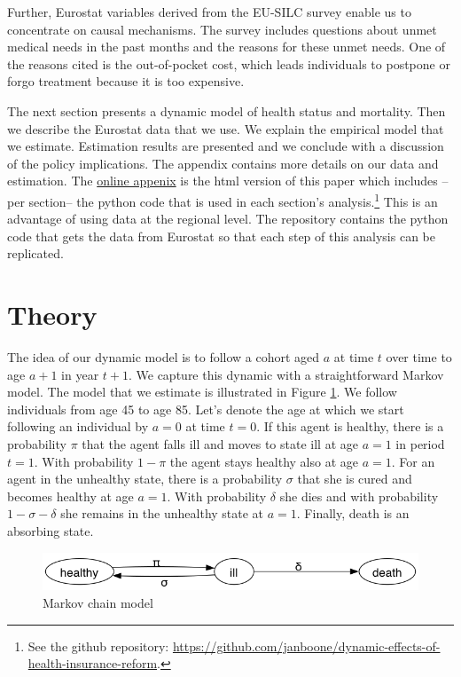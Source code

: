\documentclass[a4paper,12pt]{article}
\begin{document}
Further, Eurostat variables derived from the EU-SILC survey enable us to concentrate on causal mechanisms. The survey includes questions about unmet medical needs in the past months and the reasons for these unmet needs. One of the reasons cited is the out-of-pocket cost, which leads individuals to postpone or forgo treatment because it is too expensive.

The next section presents a dynamic model of health status and mortality. Then we describe the Eurostat data that we use. We explain the empirical model that we estimate. Estimation results are presented and we conclude with a discussion of the policy implications. The appendix contains more details on our data and estimation. The \href{https://janboone.github.io/dynamic-effects-of-health-insurance-reform/index.html}{online appenix} is the html version of this paper which includes --per section-- the python code that is used in each section's analysis.\footnote{See the github repository: \href{https://github.com/janboone/dynamic-effects-of-health-insurance-reform}{https://github.com/janboone/dynamic-effects-of-health-insurance-reform}.} This is an advantage of using data at the regional level. The repository contains the python code that gets the data from Eurostat so that each step of this analysis can be replicated.
\section{Theory}
\label{sec:orgda5a0b0}
\label{sec:theory}

The idea of our dynamic model is to follow a cohort aged \(a\) at time \(t\) over time to age \(a+1\) in year \(t+1\). We capture this dynamic with a straightforward Markov model. The model that we estimate is illustrated in Figure \ref{fig:markov}. We follow individuals from age 45 to age 85. Let's denote the age at which we start following an individual by \(a=0\) at time \(t=0\). If this agent is healthy, there is a probability \(\pi\) that the agent falls ill and moves to state ill at age \(a=1\) in period \(t=1\). With probability \(1-\pi\) the agent stays healthy also at age \(a=1\). For an agent in the unhealthy state, there is a probability \(\sigma\) that she is cured and becomes healthy at age \(a=1\). With probability \(\delta\) she dies and with probability \(1-\sigma-\delta\) she remains in the unhealthy state at \(a=1\). Finally, death is an absorbing state.


\begin{figure}[htbp]
\centering
\includegraphics[width=.9\linewidth]{./figures/markov_chain.png}
\caption{\label{fig:markov}Markov chain model}
\end{figure}
\end{document}
